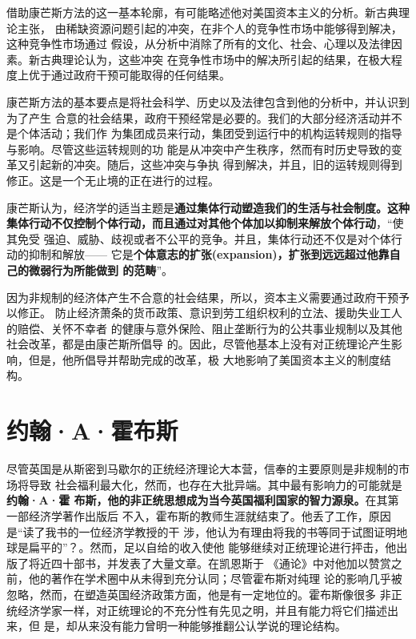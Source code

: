 借助康芒斯方法的这一基本轮廓，有可能略述他对美国资本主义的分析。新古典理论主张，
由稀缺资源问题引起的冲突，在非个人的竞争性市场中能够得到解决，这种竞争性市场通过
假设，从分析中消除了所有的文化、社会、心理以及法律因素。新古典理论认为，这些冲突
在竞争性市场中的解决所引起的结果，在极大程度上优于通过政府干预可能取得的任何结果。

康芒斯方法的基本要点是将社会科学、历史以及法律包含到他的分析中，并认识到为了产生
合意的社会结果，政府干预经常是必要的。我们的大部分经济活动并不是个体活动；我们作
为集团成员来行动，集团受到运行中的机构运转规则的指导与影响。尽管这些运转规则的功
能是从冲突中产生秩序，然而有时历史导致的变革又引起新的冲突。随后，这些冲突与争执
得到解决，并且，旧的运转规则得到修正。这是一个无止境的正在进行的过程。

康芒斯认为，经济学的适当主题是\textbf{通过集体行动塑造我们的生活与社会制度。这种
集体行动不仅控制个体行动，而且通过对其他个体加以抑制来解放个体行动}，“使其免受
强迫、威胁、歧视或者不公平的竞争。并且，集体行动还不仅是对个体行动的抑制和解放——
它是\textbf{个体意志的扩张(expansion)，扩张到远远超过他靠自己的微弱行为所能做到
的范畴}”。

因为非规制的经济体产生不合意的社会结果，所以，资本主义需要通过政府干预予以修正。
防止经济萧条的货币政策、意识到劳工组织权利的立法、援助失业工人的赔偿、关怀不幸者
的健康与意外保险、阻止垄断行为的公共事业规制以及其他社会改革，都是由康芒斯所倡导
的。因此，尽管他基本上没有对正统理论产生影响，但是，他所倡导并帮助完成的改革，极
大地影响了美国资本主义的制度结构。

\section{约翰·A·霍布斯}

尽管英国是从斯密到马歇尔的正统经济理论大本营，信奉的主要原则是非规制的市场将导致
社会福利最大化，然而，也存在大批异端。其中最有影响力的可能就是\textbf{约翰·A·霍
布斯，他的非正统思想成为当今英国福利国家的智力源泉。}在其第一部经济学著作出版后
不入，霍布斯的教师生涯就结束了。他丢了工作，原因是“读了我书的一位经济学教授的干
涉，他认为有理由将我的书等同于试图证明地球是扁平的”？。然而，足以自给的收入使他
能够继续对正统理论进行抨击，他出版了将近四十部书，并发表了大量文章。在凯恩斯于
《通论》中对他加以赞赏之前，他的著作在学术圈中从未得到充分认同；尽管霍布斯对纯理
论的影响几乎被忽略，然而，在塑造英国经济政策方面，他是有一定地位的。霍布斯像很多
非正统经济学家一样，对正统理论的不充分性有先见之明，并且有能力将它们描述出来，但
是，却从来没有能力曾明一种能够推翻公认学说的理论结构。

